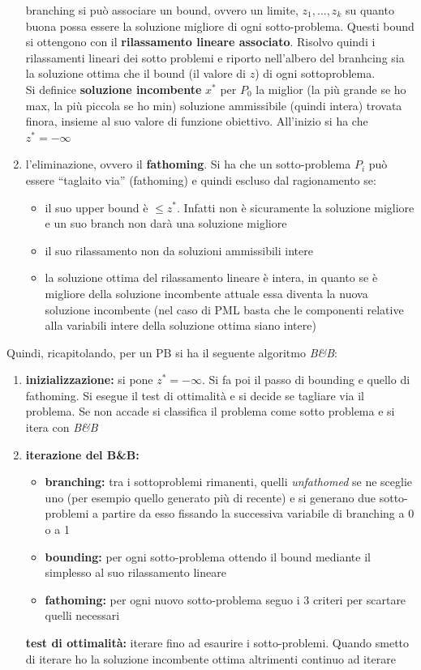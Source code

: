 \documentclass[a4paper,12pt, oneside]{book}
\begin{document}
\begin{enumerate}
  branching si può associare un bound, ovvero un limite,
  $z_1,\ldots,z_k$ su quanto buona possa essere la soluzione migliore
  di ogni sotto-problema. Questi bound si ottengono con il
  \textbf{rilassamento lineare associato}. Risolvo quindi i
  rilassamenti lineari dei sotto problemi e riporto nell'albero del
  branhcing sia la soluzione ottima che il bound (il valore di $z$) di
  ogni sottoproblema.\\
  Si definice \textbf{soluzione incombente} $x^*$ per $P_0$ la miglior (la
  più grande se ho max, la più piccola se ho min)   soluzione
  ammissibile (quindi intera) trovata finora, insieme al suo valore
  di funzione obiettivo. All'inizio si ha che $z^*=-\infty$
  \item l'eliminazione, ovvero il \textbf{fathoming}. Si ha che un
  sotto-problema $P_i$ può essere ``taglaito via'' (fathoming) e
  quindi escluso dal ragionamento se:
  \begin{itemize}
    \item il suo upper bound è $\leq z^*$. Infatti non è sicuramente
    la soluzione migliore e un suo branch non darà una soluzione
    migliore
    \item il suo rilassamento non da soluzioni ammissibili intere
    \item la soluzione ottima del rilassamento lineare è intera, in
    quanto se è migliore della soluzione incombente attuale essa
    diventa la nuova soluzione incombente (nel caso di PML basta che
    le componenti relative alla variabili intere della soluzione
    ottima siano intere)
  \end{itemize}
\end{enumerate}
Quindi, ricapitolando, per un PB si ha il seguente algoritmo
\textit{B\&B}:
\begin{shaded}
  \begin{enumerate}
    \item \textbf{inizializzazione:} si pone $z^*=-\infty$. Si fa poi
    il passo di bounding e quello di fathoming. Si esegue il test di
    ottimalità e si decide se tagliare via il problema. Se non accade
    si classifica il problema come sotto problema e si itera con
    \textit{B\&B}
    \item \textbf{iterazione del B\&B:}
    \begin{itemize}
      \item \textbf{branching:} tra i sottoproblemi rimanenti, quelli
      \textit{unfathomed} se ne sceglie uno (per esempio quello
      generato più di recente) e si generano due sotto-problemi a
      partire da esso fissando la successiva variabile di branching a
      0 o a 1
      \item \textbf{bounding:} per ogni sotto-problema ottendo il
      bound mediante il simplesso al suo rilassamento lineare
      \item \textbf{fathoming:} per ogni nuovo sotto-problema seguo i
      3 criteri per scartare quelli necessari
    \end{itemize}
    \textbf{test di ottimalità:} iterare fino ad esaurire i
    sotto-problemi. Quando smetto di iterare ho la soluzione
    incombente ottima altrimenti continuo ad iterare
  \end{enumerate}
\end{shaded}
\end{document}
